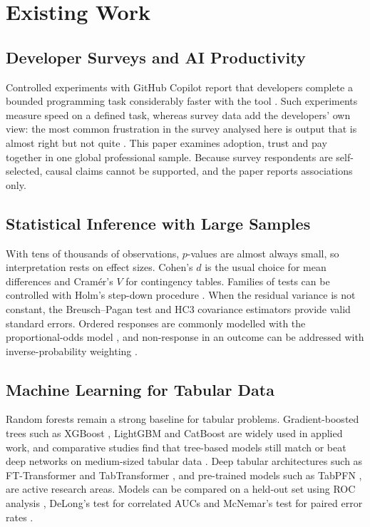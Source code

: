 \documentclass[conference]{IEEEtran}
\begin{document}
\section{Existing Work}

\subsection{Developer Surveys and AI Productivity}
Controlled experiments with GitHub Copilot report that developers complete a bounded programming task considerably faster with the tool \cite{peng2023}. Such experiments measure speed on a defined task, whereas survey data add the developers' own view: the most common frustration in the survey analysed here is output that is almost right but not quite \cite{so2025}. This paper examines adoption, trust and pay together in one global professional sample. Because survey respondents are self-selected, causal claims cannot be supported, and the paper reports associations only.

\subsection{Statistical Inference with Large Samples}
With tens of thousands of observations, $p$-values are almost always small, so interpretation rests on effect sizes. Cohen's $d$ \cite{cohen1988} is the usual choice for mean differences and Cram\'er's $V$ for contingency tables. Families of tests can be controlled with Holm's step-down procedure \cite{holm1979}. When the residual variance is not constant, the Breusch--Pagan test \cite{breusch1979} and HC3 covariance estimators \cite{white1980,mackinnon1985} provide valid standard errors. Ordered responses are commonly modelled with the proportional-odds model \cite{mccullagh1980,agresti2010}, and non-response in an outcome can be addressed with inverse-probability weighting \cite{seaman2013}.

\subsection{Machine Learning for Tabular Data}
Random forests \cite{breiman2001} remain a strong baseline for tabular problems. Gradient-boosted trees such as XGBoost \cite{chen2016}, LightGBM \cite{ke2017} and CatBoost \cite{prokhorenkova2018} are widely used in applied work, and comparative studies find that tree-based models still match or beat deep networks on medium-sized tabular data \cite{grinsztajn2022,shwartz2022}. Deep tabular architectures such as FT-Transformer \cite{gorishniy2021} and TabTransformer \cite{huang2020}, and pre-trained models such as TabPFN \cite{hollmann2025}, are active research areas. Models can be compared on a held-out set using ROC analysis \cite{fawcett2006}, DeLong's test for correlated AUCs \cite{delong1988} and McNemar's test for paired error rates \cite{mcnemar1947}.
\end{document}

